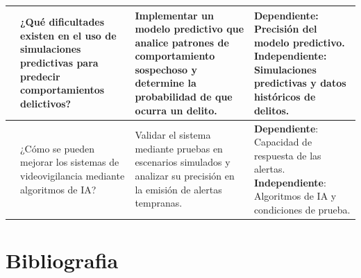 \documentclass[listof=nochaptergap,12pt,times,authoryear]{report}
\begin{document}
\begin{landscape}
\begin{longtable}{| m{4cm} | m{7cm} | m{7cm} | m{7cm} |}
    & ¿Qué dificultades existen en el uso de simulaciones predictivas para predecir comportamientos delictivos? & Implementar un modelo predictivo que analice patrones de comportamiento sospechoso y determine la probabilidad de que ocurra un delito. & \textbf{Dependiente}: Precisión del modelo predictivo. \newline \textbf{Independiente}: Simulaciones predictivas y datos históricos de delitos. \\ \hline
    
    & ¿Cómo se pueden mejorar los sistemas de videovigilancia mediante algoritmos de IA? & Validar el sistema mediante pruebas en escenarios simulados y analizar su precisión en la emisión de alertas tempranas. & \textbf{Dependiente}: Capacidad de respuesta de las alertas. \newline \textbf{Independiente}: Algoritmos de IA y condiciones de prueba. \\ \hline
\end{longtable}
\end{landscape}

\section{Bibliografia}
\end{document}
